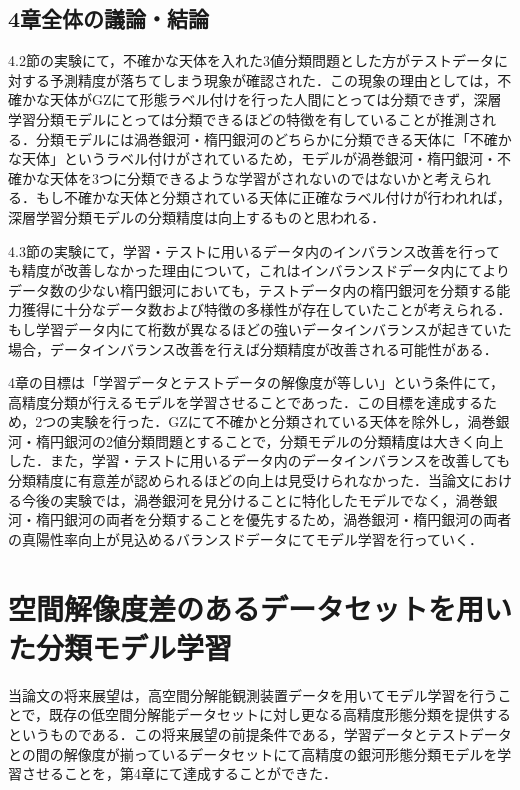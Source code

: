 \documentclass[a4j, 11pt]{jreport}
\begin{document}
\section{4章全体の議論・結論}
4.2節の実験にて，不確かな天体を入れた3値分類問題とした方がテストデータに対する予測精度が落ちてしまう現象が確認された．この現象の理由としては，不確かな天体がGZにて形態ラベル付けを行った人間にとっては分類できず，深層学習分類モデルにとっては分類できるほどの特徴を有していることが推測される．分類モデルには渦巻銀河・楕円銀河のどちらかに分類できる天体に「不確かな天体」というラベル付けがされているため，モデルが渦巻銀河・楕円銀河・不確かな天体を3つに分類できるような学習がされないのではないかと考えられる．もし不確かな天体と分類されている天体に正確なラベル付けが行われれば，深層学習分類モデルの分類精度は向上するものと思われる．


4.3節の実験にて，学習・テストに用いるデータ内のインバランス改善を行っても精度が改善しなかった理由について，これはインバランスドデータ内にてよりデータ数の少ない楕円銀河においても，テストデータ内の楕円銀河を分類する能力獲得に十分なデータ数および特徴の多様性が存在していたことが考えられる．もし学習データ内にて桁数が異なるほどの強いデータインバランスが起きていた場合，データインバランス改善を行えば分類精度が改善される可能性がある．

4章の目標は「学習データとテストデータの解像度が等しい」という条件にて，高精度分類が行えるモデルを学習させることであった．この目標を達成するため，2つの実験を行った．GZにて不確かと分類されている天体を除外し，渦巻銀河・楕円銀河の2値分類問題とすることで，分類モデルの分類精度は大きく向上した．また，学習・テストに用いるデータ内のデータインバランスを改善しても分類精度に有意差が認められるほどの向上は見受けられなかった．当論文における今後の実験では，渦巻銀河を見分けることに特化したモデルでなく，渦巻銀河・楕円銀河の両者を分類することを優先するため，渦巻銀河・楕円銀河の両者の真陽性率向上が見込めるバランスドデータにてモデル学習を行っていく．



\newpage
\chapter{空間解像度差のあるデータセットを用いた分類モデル学習}
当論文の将来展望は，高空間分解能観測装置データを用いてモデル学習を行うことで，既存の低空間分解能データセットに対し更なる高精度形態分類を提供するというものである．この将来展望の前提条件である，学習データとテストデータとの間の解像度が揃っているデータセットにて高精度の銀河形態分類モデルを学習させることを，第4章にて達成することができた．
\end{document}
